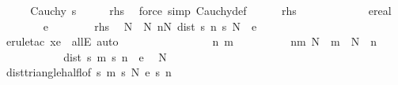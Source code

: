 \begin{isabellebody}
\ \isanewline
\ \ \isamarkupfalse%
\ {\isachardoublequoteopen}Cauchy\ s{\isachardoublequoteclose}\isanewline
\ \ \isamarkupfalse%
\ \isamarkupfalse%
\ {\isacharquery}{\kern0pt}rhs\ \isamarkupfalse%
\ {\isacharparenleft}{\kern0pt}force\ simp{\isacharcolon}{\kern0pt}\ Cauchy{\isacharunderscore}{\kern0pt}def{\isacharparenright}{\kern0pt}\isanewline
{}\isamarkupfalse%
\isanewline
\ \ \ \ \isamarkupfalse%
\ {\isacharquery}{\kern0pt}rhs\isanewline
\ \ \ \ \isacommand{{\isacharbraceleft}{\kern0pt}}\isamarkupfalse%
\isanewline
\ \ \ \ \ \ \isamarkupfalse%
\ e{\isacharcolon}{\kern0pt}{\isacharcolon}{\kern0pt}real\isanewline
\ \ \ \ \ \ \isamarkupfalse%
\ {\isachardoublequoteopen}e{\isachargreater}{\kern0pt}{}{\isachardoublequoteclose}\isanewline
\ \ \ \ \ \ \isamarkupfalse%
\ {\isacartoucheopen}{\isacharquery}{\kern0pt}rhs{\isacartoucheclose}\ \isamarkupfalse%
\ N\ \ N{\isacharcolon}{\kern0pt}\ {\isachardoublequoteopen}{\isasymforall}n{\isasymge}N{\isachardot}{\kern0pt}\ dist\ {\isacharparenleft}{\kern0pt}s\ n{\isacharparenright}{\kern0pt}\ {\isacharparenleft}{\kern0pt}s\ N{\isacharparenright}{\kern0pt}\ {\isacharless}{\kern0pt}\ e{\isacharslash}{\kern0pt}{}{\isachardoublequoteclose}\isanewline
\ \ \ \ \ \ \ \ \isamarkupfalse%
\ {\isacharparenleft}{\kern0pt}erule{\isacharunderscore}{\kern0pt}tac\ x{\isacharequal}{\kern0pt}{\isachardoublequoteopen}e{\isacharslash}{\kern0pt}{}{\isachardoublequoteclose}\ \ allE{\isacharparenright}{\kern0pt}\ auto\isanewline
\ \ \ \ \ \ \isacommand{{\isacharbraceleft}{\kern0pt}}\isamarkupfalse%
\isanewline
\ \ \ \ \ \ \ \ \isamarkupfalse%
\ n\ m\isanewline
\ \ \ \ \ \ \ \ \isamarkupfalse%
\ nm{\isacharcolon}{\kern0pt}\ {\isachardoublequoteopen}N\ {\isasymle}\ m\ {\isasymand}\ N\ {\isasymle}\ n{\isachardoublequoteclose}\isanewline
\ \ \ \ \ \ \ \ \isamarkupfalse%
\ \isamarkupfalse%
\ {\isachardoublequoteopen}dist\ {\isacharparenleft}{\kern0pt}s\ m{\isacharparenright}{\kern0pt}\ {\isacharparenleft}{\kern0pt}s\ n{\isacharparenright}{\kern0pt}\ {\isacharless}{\kern0pt}\ e{\isachardoublequoteclose}\ \isamarkupfalse%
\ N\isanewline
\ \ \ \ \ \ \ \ \ \ \isamarkupfalse%
\ dist{\isacharunderscore}{\kern0pt}triangle{\isacharunderscore}{\kern0pt}half{\isacharunderscore}{\kern0pt}l{\isacharbrackleft}{\kern0pt}of\ {\isachardoublequoteopen}s\ m{\isachardoublequoteclose}\ {\isachardoublequoteopen}s\ N{\isachardoublequoteclose}\ {\isachardoublequoteopen}e{\isachardoublequoteclose}\ {\isachardoublequoteopen}s\ n{\isachardoublequoteclose}{\isacharbrackright}{\kern0pt}\isanewline

\end{isabellebody}

